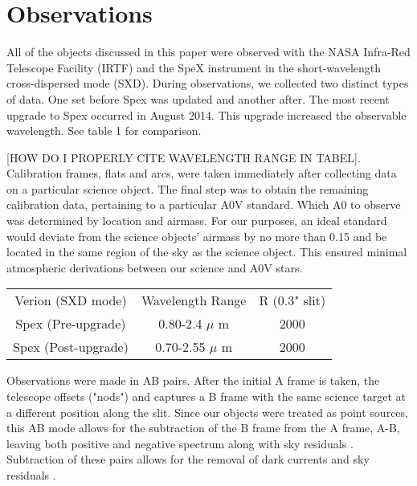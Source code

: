 \section{Observations}



All of the objects discussed in this paper were observed with the NASA Infra-Red Telescope Facility (IRTF) and the SpeX instrument \cite{Rayner_1998} in the short-wavelength cross-dispersed mode (SXD).  During observations, we collected two distinct types of data.  One set before Spex was updated and another after.  The most recent upgrade to Spex occurred in August 2014.  This upgrade increased the observable wavelength.  See table 1 for comparison.

[HOW DO I PROPERLY CITE WAVELENGTH RANGE IN TABEL]\cite{RAYER_SPEX_OBSERVING_MANUAL_or_Spextool_2015_manual}.\\


Calibration frames, flats and arcs, were taken immediately after collecting data on a particular science object.  The final step was to obtain the remaining calibration data, pertaining to a particular A0V standard.  Which A0 to observe was determined by location and airmass.  For our purposes, an ideal standard would deviate from the science objects' airmass by no more than 0.15 and be located in the same region of the sky as the science object.  This ensured minimal atmospheric derivations between our science and A0V stars.

\begin{table}
\begin{tabular}{ccc}
Verion (SXD mode) & Wavelength Range & R (0.3" slit) \\
Spex (Pre-upgrade) & 0.80-2.4 $\mu$ m & 2000 \\
Spex (Post-upgrade) & 0.70-2.55 $\mu$ m & 2000 \\
\end{tabular}
\end{table}




Observations were made in AB pairs.  After the initial A frame is taken, the telescope offsets ("nods") and captures a B frame with the same science target at a different position along the slit.  Since our objects were treated as point sources, this AB mode allows for the subtraction of the B frame from the A frame, A-B, leaving both positive and negative spectrum along with sky residuals \cite{Cushing_2004}. Subtraction of these pairs allows for the removal of dark currents and sky residuals \cite{Joyce_1992}.\\


